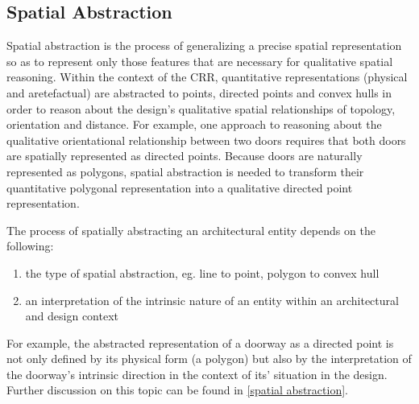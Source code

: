 \documentclass[12pt]{ucthesis}
\begin{document}
\subsection{Spatial Abstraction}
Spatial abstraction is the process of generalizing a precise spatial representation so as to represent only those features that are necessary for qualitative spatial reasoning. Within the context of the CRR, quantitative representations (physical and aretefactual) are abstracted to points, directed points and convex hulls in order to reason about the design's qualitative spatial relationships of topology, orientation and distance. For example, one approach to reasoning about the qualitative orientational relationship between two doors requires that both doors are spatially represented as directed points. Because doors are naturally represented as polygons, spatial abstraction is needed to transform their quantitative polygonal representation into a qualitative directed point representation.



The process of spatially abstracting an architectural entity depends on the following:
\begin{enumerate} \label{abs dependencies}
\item the type of spatial abstraction, eg. line to point, polygon to convex hull
\item an interpretation of the intrinsic nature of an entity within an architectural and design context
\end{enumerate}
For example, the abstracted representation of a doorway as a directed point is not only defined by its physical form (a polygon) but also by the interpretation of the doorway's intrinsic direction in the context of its' situation in the design. Further discussion on this topic can be found in \ref{spatial abstraction}.
\end{document}
